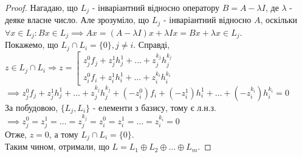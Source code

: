 \begin{proof}
Нагадаю, що $L_j$ - інваріантний відносно оператору $B = A-\lambda I$, де $\lambda$ - деяке власне число. Але зрозуміло, що $L_j$ - інваріантний відносно $A$, оскільки\\
$\forall x \in L_j: Bx \in L_j \implies Ax = (A-\lambda I)x + \lambda Ix = Bx + \lambda x \in L_j$.\\
Покажемо, що $L_j \cap L_i = \{0\}, j \neq i$. Справді,\\
$z \in L_j \cap L_i \Rightarrow z = \left[\begin{gathered} z^0_j f_j + z^1_j h^1_j + \dots + z_j^{k_j} h_j^{k_j} \\ z_i^0f_i + z_i^1 h_i^1 + \dots + z_i^{k_i} h_i^{k_i} \end{gathered} \right.$\\
$\implies z^0_j f_j + z^1_j h^1_j + \dots + z_j^{k_j} h_j^{k_j} + (-z_i^0)f_i + (-z_i^1) h_i^1 + \dots + (-z_i^{k_i}) h_i^{k_i} = 0$\\
За побудовою, $\{L_j, L_i\}$ - елементи з базису, тому є л.н.з.\\
$\implies z^0_j = z^1_j = \dots = z^{k_j}_j = z^0_i = z^1_i = \dots = z^{k_i}_i = 0$\\
Отже, $z = 0$, а тому $L_j \cap L_i = \{0\}$.\\
Таким чином, отримали, що $L = L_1  \oplus  L_2  \oplus  \dots  \oplus  L_m$.
\end{proof}

